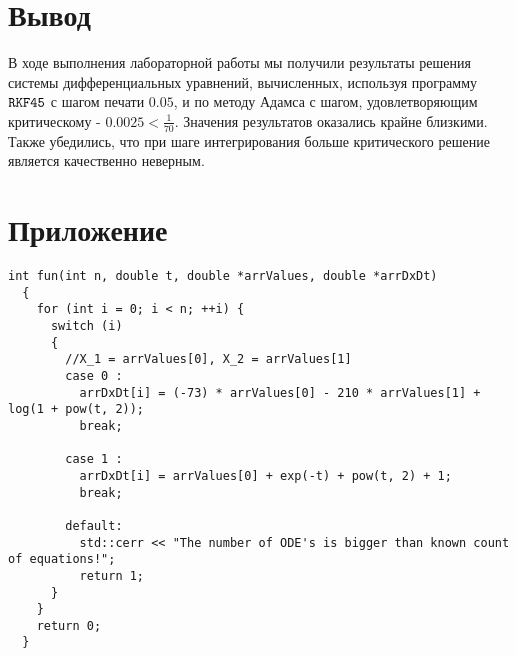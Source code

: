 \documentclass[a4paper,11pt]{article}
\begin{document}
\section{Вывод}
В ходе выполнения лабораторной работы мы получили результаты решения системы дифференциальных уравнений, вычисленных, используя программу $\verb|RKF45|$ с шагом печати $0.05$, и по методу Адамса с шагом, удовлетворяющим критическому - $0.0025 < \frac{1}{70}$. Значения результатов оказались крайне близкими. Также убедились, что при шаге интегрирования больше критического решение является качественно неверным.

\section{Приложение}
\begin{lstlisting}[label=fun, caption=Function]
  int fun(int n, double t, double *arrValues, double *arrDxDt)
  {
    for (int i = 0; i < n; ++i) {
      switch (i)
      {
        //X_1 = arrValues[0], X_2 = arrValues[1]
        case 0 :
          arrDxDt[i] = (-73) * arrValues[0] - 210 * arrValues[1] + log(1 + pow(t, 2));
          break;

        case 1 :
          arrDxDt[i] = arrValues[0] + exp(-t) + pow(t, 2) + 1;
          break;

        default:
          std::cerr << "The number of ODE's is bigger than known count of equations!";
          return 1;
      }
    }
    return 0;
  }
\end{lstlisting}
\end{document}
